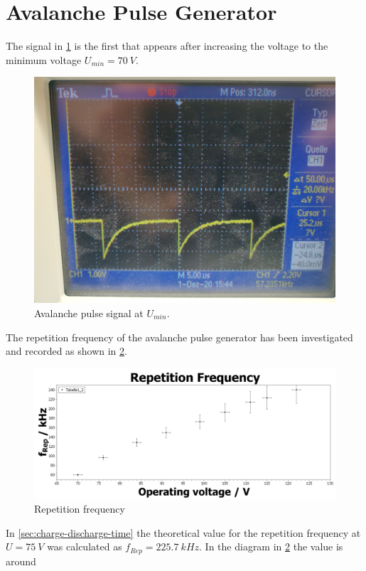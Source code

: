 \section{Avalanche Pulse Generator}
    The signal in \cref{fig:img20201201084956} is the first that appears after increasing the voltage to the minimum
    voltage $ U_{min}=\SI{70}{V} $.
    \begin{figure}[h]
        \centering
        \includegraphics[width=0.7\linewidth]{messdaten/IMG_20201201_084956.jpg}
        \caption[Avalanche pulse signal at $ U_{min} $]{Avalanche pulse signal at $ U_{min} $.}
        \label{fig:img20201201084956}
    \end{figure}
    The repetition frequency of the avalanche pulse generator has been investigated and recorded as shown in \cref{fig:repetition-frequency}.
    \begin{figure}[h]
        \centering
        \includegraphics[width=1\linewidth]{messdaten/Repetition Frequency.jpg}
        \caption[Repetition frequency]{Repetition frequency}
        \label{fig:repetition-frequency}
    \end{figure}
    In \cref{sec:charge-discharge-time} the theoretical value for the repetition frequency at $ U=\SI{75}{V} $ was
    calculated as $ f_{Rep}=\SI{225.7}{kHz} $. In the diagram in \cref{fig:repetition-frequency} the value is around
